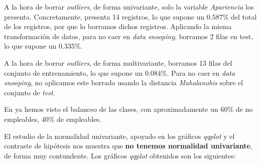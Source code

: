 \documentclass[11pt]{article}
\begin{document}
A la hora de borrar \textit{outliers}, de forma univariante, solo la variable \textit{Apariencia} los presenta. Concretamente, presenta 14 registros, lo que supone un 0.587\% del total de los registros, por que lo borramos dichos registros. Aplicando la misma transformación de datos, para no caer en \textit{data snooping}, borramos 2 filas en test, lo que supone un 0.335\%.

A la hora de borrar \textit{outliers}, de forma multivariante, borramos 13 filas del conjunto de entrenamiento, lo que supone un 0.084\%. Para no caer en \textit{data snooping}, no aplicamos este borrado usando la distancia \textit{Mahalanobis} sobre el conjunto de \textit{test}.

En  ya hemos visto el balanceo de las clases, con aproximadamente un 60\% de no empleables, 40\% de empleables.

El estudio de la normalidad univariante, apoyado en los gráficos \textit{qqplot} y el contraste de hipótesis nos muestra que \textbf{no tenemos normalidad univariante}, de forma muy contundente. Los gráficos \textit{qqplot} obtenidos son los siguientes:
\end{document}
